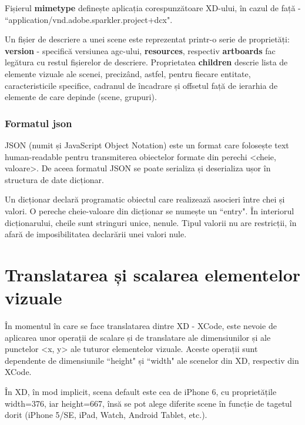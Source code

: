 Fișierul \textbf{mimetype} definește aplicația corespunzătoare XD-ului, în cazul de față - ``application/vnd.adobe.sparkler.project+dcx".

Un fișier de descriere a unei scene este reprezentat printr-o serie de proprietăți:  \textbf{version} - specifică versiunea agc-ului, \textbf{resources}, respectiv \textbf{artboards} fac legătura cu restul fișierelor de descriere. Proprietatea  \textbf{children} descrie lista de elemente vizuale ale scenei, precizând, astfel, pentru fiecare entitate, caracteristicile specifice, cadranul de încadrare și offsetul față de ierarhia de elemente de care depinde (scene, grupuri).

\subsubsection{Formatul json}

JSON (numit și JavaScript Object Notation) este un format care folosește text human-readable pentru transmiterea obiectelor formate din perechi <cheie, valoare>. De aceea formatul JSON se poate serializa și deserializa ușor în structura de date dicționar.

Un dicționar declară programatic obiectul care realizează asocieri între chei și valori. O pereche cheie-valoare din dicționar se numește un ``entry". În interiorul dicționarului, cheile sunt stringuri unice, nenule. Tipul valorii nu are restricții, în afară de imposibilitatea declarării unei valori nule.

\section{Translatarea și scalarea elementelor vizuale}\label{transScal}

În momentul în care se face translatarea dintre XD - XCode, este nevoie de aplicarea unor operații de scalare și de translatare ale dimensiunilor și ale punctelor <x, y> ale tuturor elementelor vizuale. Aceste operații sunt dependente de dimensiunile ``height" și ``width" ale scenelor din XD, respectiv din XCode. 

În XD, în mod implicit, scena default este cea de iPhone 6, cu proprietățile width=376, iar height=667, însă se pot alege diferite scene în funcție de tagetul dorit (iPhone 5/SE, iPad, Watch, Android Tablet, etc.). 

